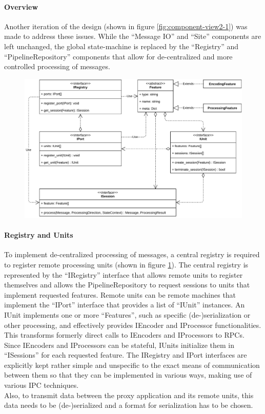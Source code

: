 \paragraph{Overview}
Another iteration of the design (shown in figure \ref{fig:component-view2-1}) was made to address these issues. While the \enquote{Message IO} and \enquote{Site} components are left unchanged, the global state-machine is replaced by the \enquote{Registry} and \enquote{PipelineRepository} components that allow for de-centralized and more controlled processing of messages.
\begin{figure}[ht]
    \centering
    \includegraphics[width=14cm]{img/ch05/component-view2-3-registry-port-unit.pdf}
    \label{fig:component-view2-3-registry-port-unit}
\end{figure}

\paragraph{Registry and Units} To implement de-centralized processing of messages, a central registry is required to register remote processing units (shown in figure \ref{fig:component-view2-3-registry-port-unit}). The central registry is represented by the \enquote{IRegistry} interface that allows remote units to register themselves and allows the PipelineRepository to request sessions to units that implement requested features. Remote units can be remote machines that implement the \enquote{IPort} interface that provides a list of \enquote{IUnit} instances. An IUnit implements one or more \enquote{Features}, such as specific (de-)serialization or other processing, and effectively provides IEncoder and IProcessor functionalities. This transforms formerly direct calls to IEncoders and IProcessors to \acp{RPC}. Since IEncoders and IProcessors can be stateful, IUnits initialize them in \enquote{ISessions} for each requested feature. The IRegistry and IPort interfaces are explicitly kept rather simple and unspecific to the exact means of communication between them so that they can be implemented in various ways, making use of various \ac{IPC} techniques.\\
Also, to transmit data between the proxy application and its remote units, this data needs to be (de-)serialized and a format for serialization has to be chosen.

